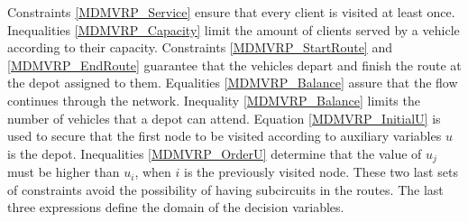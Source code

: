 \documentclass[preprint,review,12pt]{elsarticle}
\begin{document}
Constraints \eqref{MDMVRP_Service} ensure that every client is visited at least once. Inequalities \eqref{MDMVRP_Capacity} limit the amount of clients served by a vehicle according to their capacity. Constraints \eqref{MDMVRP_StartRoute} and \eqref{MDMVRP_EndRoute} guarantee that the vehicles depart and finish the route at the depot assigned to them. Equalities \eqref{MDMVRP_Balance} assure that the flow continues through the network. Inequality \eqref{MDMVRP_Balance} limits the number of vehicles that a depot can attend. Equation \eqref{MDMVRP_InitialU} is used to secure that the first node to be visited according to auxiliary variables $u$ is the depot. Inequalities \eqref{MDMVRP_OrderU} determine that the value of $u_j$ must be higher than $u_i$, when $i$ is the previously visited node. These two last sets of constraints avoid the possibility of having subcircuits in the routes. The last three expressions define the domain of the decision variables.
\end{document}
